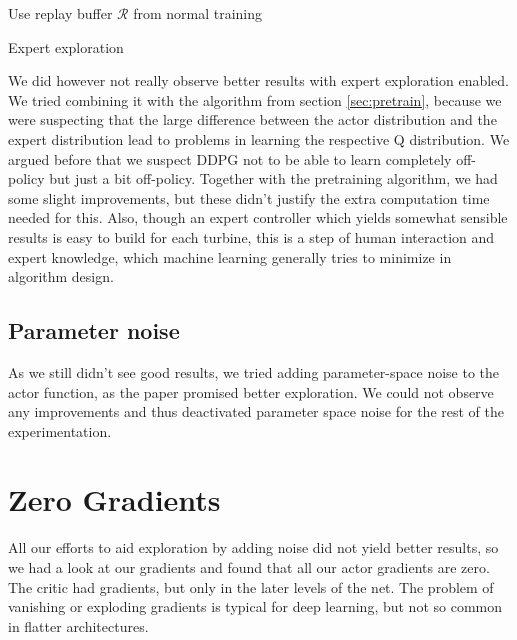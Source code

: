 \documentclass[hyperref,final,beleg]{cgvpub}
\begin{document}
\begin{algorithm}
\SetAlgoLined
Use replay buffer $\mathcal{R}$ from normal training\\

\caption{Expert exploration}
\label{alg:expertexplo}
\end{algorithm}

We did however not really observe better results with expert exploration enabled. We tried combining it with the algorithm from section \ref{sec:pretrain}, because we were suspecting that the large difference between the actor distribution and the expert distribution lead to problems in learning the respective Q distribution. We argued before that we suspect DDPG not to be able to learn completely off-policy but just a bit off-policy. Together with the pretraining algorithm, we had some slight improvements, but these didn't justify the extra computation time needed for this. Also, though an expert controller which yields somewhat sensible results is easy to build for each turbine, this is a step of human interaction and expert knowledge, which machine learning generally tries to minimize in algorithm design.

\subsection{Parameter noise}

As we still didn't see good results, we tried adding parameter-space noise \cite{plappertParameterSpaceNoise2017} to the actor function, as the paper promised better exploration. We could not observe any improvements and thus deactivated parameter space noise for the rest of the experimentation.

\section{Zero Gradients}
All our efforts to aid exploration by adding noise did not yield better results, so we had a look at our gradients and found that all our actor gradients are zero. The critic had gradients, but only in the later levels of the net. The problem of vanishing or exploding gradients is typical for deep learning, but not so common in flatter architectures.
\end{document}
